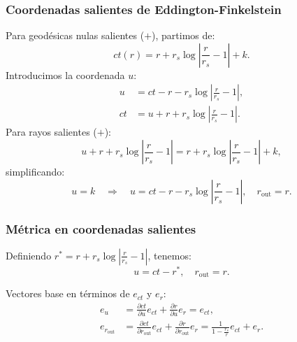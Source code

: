 \subsubsection{Coordenadas salientes de Eddington-Finkelstein}
Para geodésicas nulas salientes (\(+\)), partimos de:
\begin{equation}
    ct(r) = r + r_s \log \left| \frac{r}{r_s} - 1 \right| + k.
\end{equation}
Introducimos la coordenada \( u \):
\begin{equation}
    \begin{aligned}
        u  & = ct - r - r_s \log \left| \frac{r}{r_s} - 1 \right|, \\
        ct & = u + r + r_s \log \left| \frac{r}{r_s} - 1 \right|.
    \end{aligned}
\end{equation}
Para rayos salientes (\(+\)):
\begin{equation}
    u + r + r_s \log \left| \frac{r}{r_s} - 1 \right| = r + r_s \log \left| \frac{r}{r_s} - 1 \right| + k,
\end{equation}
simplificando:
\begin{equation}
    u = k \quad \Rightarrow \quad \boxed{u = ct - r - r_s \log \left| \frac{r}{r_s} - 1 \right|, \quad r_{\text{out}} = r}.
\end{equation}

\subsubsection{Métrica en coordenadas salientes}

Definiendo \( r^* = r + r_s \log \left| \frac{r}{r_s} - 1 \right| \), tenemos:
\begin{equation}
    u = ct - r^*, \quad r_{\text{out}} = r.
\end{equation}

Vectores base en términos de \( e_{ct} \) y \( e_r \):
\begin{equation}
    \begin{aligned}
        e_u                & = \frac{\partial ct}{\partial u} e_{ct} + \frac{\partial r}{\partial u} e_r = e_{ct},                                                             \\
        e_{r_{\text{out}}} & = \frac{\partial ct}{\partial r_{\text{out}}} e_{ct} + \frac{\partial r}{\partial r_{\text{out}}} e_r = \frac{1}{1 - \frac{r_s}{r}} e_{ct} + e_r.
    \end{aligned}
\end{equation}

